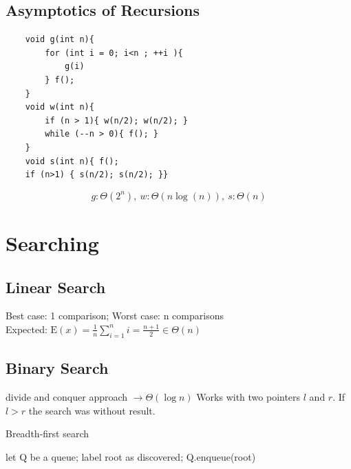 \documentclass[9pt,landscape,a4paper, table]{extarticle}
\begin{document}
\begin{multicols*}{3}
\subsection{Asymptotics of Recursions}

\begin{verbatim}
    void g(int n){
        for (int i = 0; i<n ; ++i ){
            g(i)
        } f();
    }
    void w(int n){
        if (n > 1){ w(n/2); w(n/2); } 
        while (--n > 0){ f(); }
    }
    void s(int n){ f(); 
    if (n>1) { s(n/2); s(n/2); }}
\end{verbatim}
$$g: \Theta (2^n),\ w: \Theta(n\log(n)),\ s: \Theta(n)$$

\section{Searching}

\subsection{Linear Search}

Best case: 1 comparison; 
Worst case: n comparisons\\
Expected: $\mathrm{E}(x) = \frac{1}{n}\sum_{i=1}^n i = \frac{n+1}{2} \in \Theta(n)$

\subsection{Binary Search}
divide and conquer approach $\rightarrow \Theta(\log n)$
Works with two pointers $l$ and $r$. If $l > r$ the search was without result.

{\scriptsize
\begin{algorithm}[H]
    \caption{Breadth-first search}
    
    \SetAlgoLined
    let Q be a queue; label root as discovered; Q.enqueue(root)\\
\end{algorithm}}


\end{multicols*}
\end{document}

